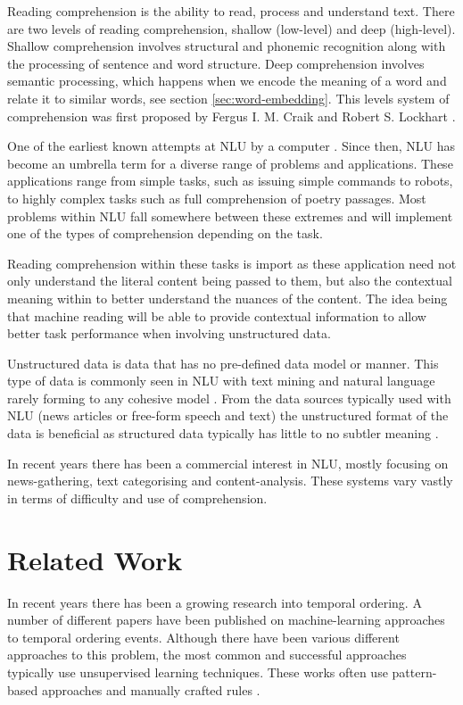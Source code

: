 \documentclass[bsc,frontabs,twoside,singlespacing,parskip,deptreport]{infthesis}     %
\begin{document}
Reading comprehension is the ability to read, process and understand text.  
There are two levels of reading comprehension, shallow (low-level) and deep (high-level).
Shallow comprehension involves structural and phonemic recognition along with the processing of sentence and  word
structure.
Deep comprehension involves semantic processing, which happens when we encode the meaning of a word and relate it
to similar words, see section \ref{sec:word-embedding}.
This levels system of comprehension was first proposed by  Fergus I. M. Craik and Robert S. Lockhart \cite{wagner2009beyond}.

One of the earliest known attempts at NLU by a computer \cite{russell1995modern}. Since then, NLU has become an
umbrella term for a diverse range of problems and applications. These applications range from simple tasks, such as
issuing simple commands to robots, to highly complex tasks such as full comprehension of poetry passages.
Most problems within NLU fall somewhere between these extremes and will implement one of the types of comprehension
depending on the task.

Reading comprehension within these tasks is import as these application need not only understand the literal content
being passed to them, but also the contextual meaning within to better understand the nuances of the content.
The idea being that machine reading will be able to provide contextual information to allow better task performance when
involving unstructured data.

Unstructured data is data that has no pre-defined data model or manner. This type of data is
commonly seen in NLU with text mining and natural language rarely forming to any cohesive model \cite{feldman2007text}.
From the data sources typically used with NLU (news articles or free-form speech and text) the unstructured format of
the data is beneficial as structured data typically has little to no subtler meaning \cite{}.

In recent years there has been a commercial interest in NLU, mostly focusing on news-gathering, text categorising and
content-analysis. These systems vary vastly in terms of difficulty and use of comprehension. 


\section{Related Work}
In recent years there has been a growing research into temporal ordering.
A number of different papers have been published on machine-learning approaches to temporal ordering events.
Although there have been various different approaches to this problem, the most common and successful approaches typically
use unsupervised learning techniques. These works often use pattern-based approaches and manually crafted rules \cite{chklovski2004mining}.  
\end{document}
